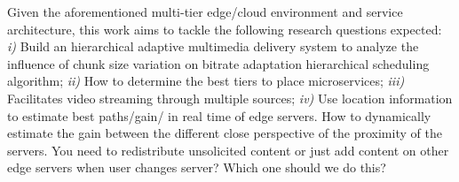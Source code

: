 Given the aforementioned multi-tier edge/cloud environment and service architecture, this work aims to tackle the following research questions expected:
\textit{i)} Build an hierarchical adaptive multimedia delivery system to analyze the influence of chunk size variation on bitrate adaptation hierarchical scheduling algorithm; \textit{ii)} How to determine the best tiers to place microservices; \textit{iii)} Facilitates video streaming through multiple sources; 
\textit{iv)} Use location information to estimate best paths/gain/ in real time of edge servers. How to dynamically estimate the gain between the different close perspective of the proximity of the servers. You need to redistribute unsolicited content or just add content on other edge servers when user changes server? Which one should we do this?


%

